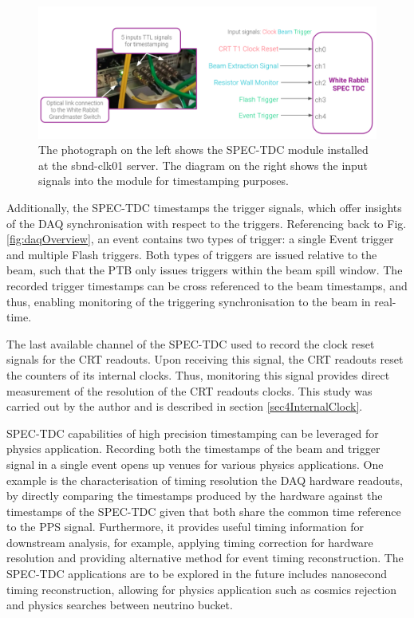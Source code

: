 \begin{figure}[htbp!] 
\centering    
\includegraphics[width=1.0\textwidth]{SPEC_TDC}
\caption[SPECTDC]{
The photograph on the left shows the SPEC-TDC module installed at the sbnd-clk01 server.
The diagram on the right shows the input signals into the module for timestamping purposes.
}
\label{fig:SPECTDC}
\end{figure}

Additionally, the SPEC-TDC timestamps the trigger signals, which offer insights of the DAQ synchronisation with respect to the triggers. 
Referencing back to Fig. \ref{fig:daqOverview}, an event contains two types of trigger: a single Event trigger and multiple Flash triggers. 
Both types of triggers are issued relative to the beam, such that the PTB only issues triggers within the beam spill window.   
The recorded trigger timestamps can be cross referenced to the beam timestamps, and thus, enabling monitoring of the triggering synchronisation to the beam in real-time.

The last available channel of the SPEC-TDC used to record the clock reset signals for the CRT readouts. 
Upon receiving this signal, the CRT readouts reset the counters of its internal clocks.
Thus, monitoring this signal provides direct measurement of the resolution of the CRT readouts clocks.
This study was carried out by the author and is described in section \ref{sec4InternalClock}.

SPEC-TDC capabilities of high precision timestamping can be leveraged for physics application.
Recording both the timestamps of the beam and trigger signal in a single event opens up venues for various physics applications. 
One example is the characterisation of timing resolution the DAQ hardware readouts, by directly comparing the timestamps produced by the hardware against the timestamps of the SPEC-TDC given that both share the common time reference to the PPS signal.
Furthermore, it provides useful timing information for downstream analysis, for example, applying timing correction for hardware resolution and providing alternative method for event timing reconstruction. 
The SPEC-TDC applications are to be explored in the future includes nanosecond timing reconstruction, allowing for physics application such as cosmics rejection and physics searches between neutrino bucket.

